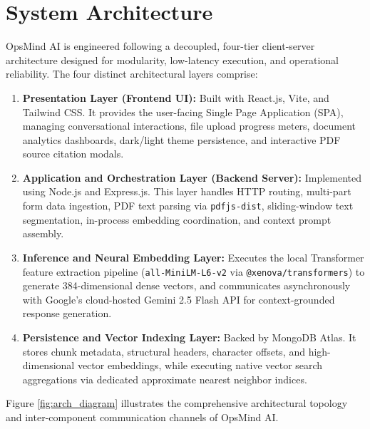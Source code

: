 \section{System Architecture}
\label{sec:design_arch}

OpsMind AI is engineered following a decoupled, four-tier client-server architecture designed for modularity, low-latency execution, and operational reliability. The four distinct architectural layers comprise:

\begin{enumerate}
    \item \textbf{Presentation Layer (Frontend UI):} Built with React.js, Vite, and Tailwind CSS. It provides the user-facing Single Page Application (SPA), managing conversational interactions, file upload progress meters, document analytics dashboards, dark/light theme persistence, and interactive PDF source citation modals.
    \item \textbf{Application and Orchestration Layer (Backend Server):} Implemented using Node.js and Express.js. This layer handles HTTP routing, multi-part form data ingestion, PDF text parsing via \texttt{pdfjs-dist}, sliding-window text segmentation, in-process embedding coordination, and context prompt assembly.
    \item \textbf{Inference and Neural Embedding Layer:} Executes the local Transformer feature extraction pipeline (\texttt{all-MiniLM-L6-v2} via \texttt{@xenova/transformers}) to generate 384-dimensional dense vectors, and communicates asynchronously with Google's cloud-hosted Gemini 2.5 Flash API for context-grounded response generation.
    \item \textbf{Persistence and Vector Indexing Layer:} Backed by MongoDB Atlas. It stores chunk metadata, structural headers, character offsets, and high-dimensional vector embeddings, while executing native vector search aggregations via dedicated approximate nearest neighbor indices.
\end{enumerate}

Figure \ref{fig:arch_diagram} illustrates the comprehensive architectural topology and inter-component communication channels of OpsMind AI.

